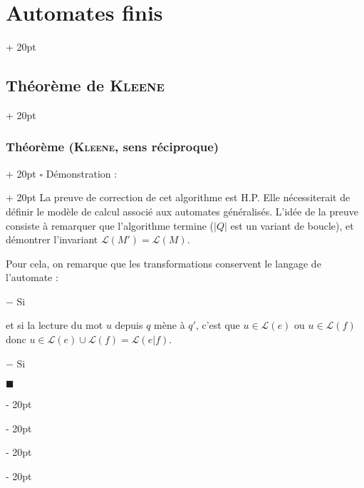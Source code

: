 \documentclass[a4paper, 12pt, twoside]{article}
\newcommand{\abs}[1]{\left\lvert #1 \right\rvert}
\newcommand{\ind}[1][20pt]{\advance\leftskip + #1}
\newcommand{\deind}[1][20pt]{\advance\leftskip - #1}
\newenvironment{indt}[2][20pt]{#2 \par \ind[#1]}{\par \deind} %
\newenvironment{proof}[1][{Démonstration :}]{\begin{indt}{$\square$ #1}}{$\blacksquare$ \end{indt}}
\begin{document}
\begin{indt}{\section{Automates finis}}
\begin{indt}{\subsection{Théorème de \textsc{Kleene}}}
\begin{indt}{\subsubsection{Théorème (\textsc{Kleene}, sens réciproque)}}
\begin{proof}
                    La preuve de correction de cet algorithme est H.P. Elle nécessiterait de définir le modèle de calcul associé aux automates généralisés.
                    L'idée de la preuve consiste à remarquer que l'algorithme termine ($\abs Q$ est un variant de boucle), et démontrer l'invariant $\mathcal L(M') = \mathcal L(M)$.

                    Pour cela, on remarque que les transformations conservent le langage de l'automate :

                    $-$ Si
                    \begin{center}
                    \end{center}
                    et si la lecture du mot $u$ depuis $q$ mène à $q'$, c'est que $u \in \mathcal L(e)$ ou $u \in \mathcal L(f)$ donc $u \in \mathcal L(e) \cup \mathcal L(f) = \mathcal L(e | f)$.

                    \vspace{6pt}
                    
                    $-$ Si
                    \begin{center}
\end{center}
\end{proof}
\end{indt}
\end{indt}
\end{indt}
\end{document}
